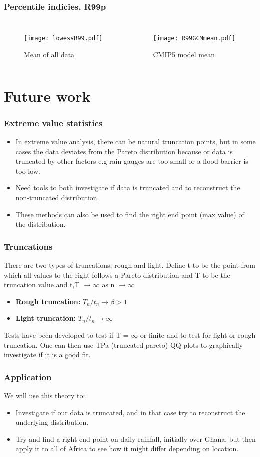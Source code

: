 \documentclass{beamer}
\begin{document}
\begin{frame}
\frametitle{Percentile indicies, R99p}
\begin{columns}
	\begin{figure}
		\texttt{[image: lowessR99.pdf]}
		\caption{Mean of all data}
	\end{figure}
	\begin{figure}
		\texttt{[image: R99GCMmean.pdf]}
		\caption{CMIP5 model mean}
	\end{figure}
\end{columns}
\end{frame}

\section{Future work}

\begin{frame}
\frametitle{Extreme value statistics}
\begin{itemize}
	\item In extreme value analysis, there can be natural truncation points, but in some cases the data deviates from the Pareto distribution because or data is truncated by other factors e.g rain gauges are too small or a flood barrier is too low. 
	\item Need tools to both investigate if data is truncated and to reconstruct the non-truncated distribution.
	\item These methods can also be used to find the right end point (max value) of the distribution.
\end{itemize}
\end{frame}

\begin{frame}
\frametitle{Truncations}
There are two types of truncations, rough and light. Define t to be the point from which all values to the right follows a Pareto distribution and T to be the truncation value and t,T $\rightarrow \infty$ as n $\rightarrow \infty$
\begin{itemize}
	\item \textbf{Rough truncation:} $T_n / t_n \rightarrow \beta > 1 $
	\item \textbf{Light truncation:} $T_n / t_n \rightarrow \infty$
\end{itemize}
Tests have been developed to test if T = $\infty$ or finite and to test for light or rough truncation. One can then use TPa (truncated pareto) QQ-plots to graphically investigate if it is a good fit. 
\end{frame}

\begin{frame}
\frametitle{Application}
We will use this theory to:
\begin{itemize}
	\item Investigate if our data is truncated, and in that case try to reconstruct the underlying distribution.
	\item Try and find a right end point on daily rainfall, initially over Ghana, but then apply it to all of Africa to see how it might differ depending on location.
\end{itemize}
\end{frame}
\end{document}
